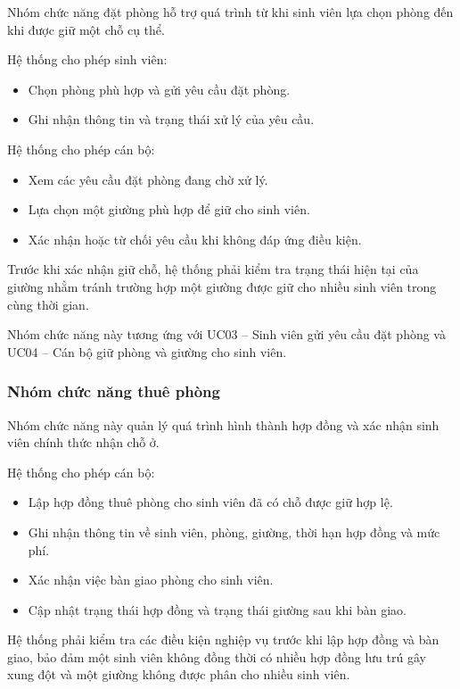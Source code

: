 Nhóm chức năng đặt phòng hỗ trợ quá trình từ khi sinh viên lựa chọn phòng đến khi được giữ một chỗ cụ thể.

Hệ thống cho phép sinh viên:

\begin{itemize}[leftmargin=1.4em]
\item Chọn phòng phù hợp và gửi yêu cầu đặt phòng.
\item Ghi nhận thông tin và trạng thái xử lý của yêu cầu.
\end{itemize}

Hệ thống cho phép cán bộ:

\begin{itemize}[leftmargin=1.4em]
\item Xem các yêu cầu đặt phòng đang chờ xử lý.
\item Lựa chọn một giường phù hợp để giữ cho sinh viên.
\item Xác nhận hoặc từ chối yêu cầu khi không đáp ứng điều kiện.
\end{itemize}

Trước khi xác nhận giữ chỗ, hệ thống phải kiểm tra trạng thái hiện tại của giường nhằm tránh trường hợp một giường được giữ cho nhiều sinh viên trong cùng thời gian.

Nhóm chức năng này tương ứng với UC03 – Sinh viên gửi yêu cầu đặt phòng và UC04 – Cán bộ giữ phòng và giường cho sinh viên.

\subsubsection{Nhóm chức năng thuê phòng}

Nhóm chức năng này quản lý quá trình hình thành hợp đồng và xác nhận sinh viên chính thức nhận chỗ ở.

Hệ thống cho phép cán bộ:

\begin{itemize}[leftmargin=1.4em]
\item Lập hợp đồng thuê phòng cho sinh viên đã có chỗ được giữ hợp lệ.
\item Ghi nhận thông tin về sinh viên, phòng, giường, thời hạn hợp đồng và mức phí.
\item Xác nhận việc bàn giao phòng cho sinh viên.
\item Cập nhật trạng thái hợp đồng và trạng thái giường sau khi bàn giao.
\end{itemize}

Hệ thống phải kiểm tra các điều kiện nghiệp vụ trước khi lập hợp đồng và bàn giao, bảo đảm một sinh viên không đồng thời có nhiều hợp đồng lưu trú gây xung đột và một giường không được phân cho nhiều sinh viên.

